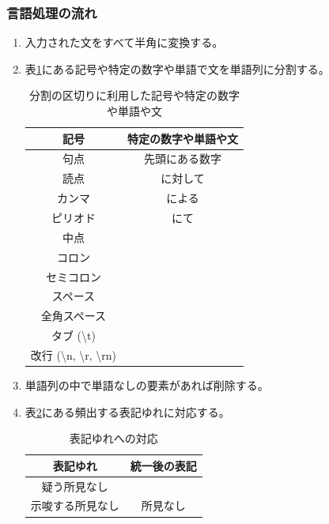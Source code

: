 \subsubsection{言語処理の流れ}
\begin{enumerate}
    \item 入力された文をすべて半角に変換する。
    \item 表\ref{tb:nl1}にある記号や特定の数字や単語で文を単語列に分割する。
        \begin{table}[htbp]
            \caption[]{分割の区切りに利用した記号や特定の数字や単語や文}
            \label{tb:nl1}
            \centering
            \normalsize
            \begin{tabular}{c|c} \hline
                記号 & 特定の数字や単語や文 \\ \hline \hline
                句点 & 先頭にある数字 \\ \hline
                読点 & に対して \\ \hline
                カンマ & による \\ \hline
                ピリオド & にて \\ \hline
                中点 & \\ \hline
                コロン & \\ \hline
                セミコロン & \\ \hline
                スペース & \\ \hline
                全角スペース & \\ \hline
                タブ (\textbackslash t) & \\ \hline
                改行 (\textbackslash n, \textbackslash r, \textbackslash rn) & \\ \hline
            \end{tabular}
        \end{table}
    \item 単語列の中で単語なしの要素があれば削除する。
    \item 表\ref{tb:nl2}にある頻出する表記ゆれに対応する。
        \begin{table}[htbp]
            \caption[]{表記ゆれへの対応}
            \label{tb:nl2}
            \centering
            \normalsize
            \begin{tabular}{c|c} \hline
                表記ゆれ & 統一後の表記 \\ \hline \hline
                疑う所見なし & \\
                示唆する所見なし & 所見なし \\

\end{tabular}
\end{table}
\end{enumerate}
